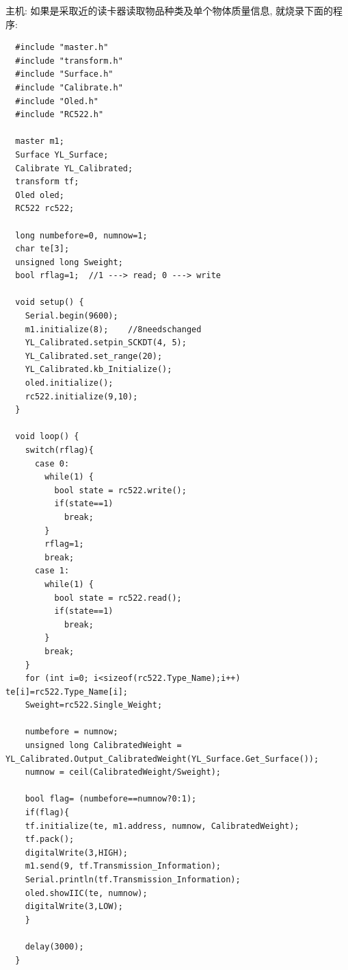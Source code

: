 \documentclass{article}
\begin{document}
\noindent 主机:
如果是采取近的读卡器读取物品种类及单个物体质量信息, 就烧录下面的程序:
\begin{lstlisting}
  #include "master.h"
  #include "transform.h"
  #include "Surface.h"
  #include "Calibrate.h"
  #include "Oled.h"
  #include "RC522.h"
  
  master m1;
  Surface YL_Surface;
  Calibrate YL_Calibrated;
  transform tf;
  Oled oled;
  RC522 rc522;
  
  long numbefore=0, numnow=1;
  char te[3];
  unsigned long Sweight;
  bool rflag=1;  //1 ---> read; 0 ---> write
  
  void setup() {
    Serial.begin(9600);
    m1.initialize(8);    //8needschanged
    YL_Calibrated.setpin_SCKDT(4, 5);
    YL_Calibrated.set_range(20);
    YL_Calibrated.kb_Initialize();
    oled.initialize();  
    rc522.initialize(9,10);
  }
  
  void loop() {
    switch(rflag){
      case 0: 
        while(1) {
          bool state = rc522.write();
          if(state==1)
            break;
        }   
        rflag=1;
        break;
      case 1:
        while(1) {
          bool state = rc522.read();
          if(state==1)
            break;
        }
        break;
    }
    for (int i=0; i<sizeof(rc522.Type_Name);i++) te[i]=rc522.Type_Name[i];
    Sweight=rc522.Single_Weight;
  
    numbefore = numnow;
    unsigned long CalibratedWeight = YL_Calibrated.Output_CalibratedWeight(YL_Surface.Get_Surface());
    numnow = ceil(CalibratedWeight/Sweight);
  
    bool flag= (numbefore==numnow?0:1);
    if(flag){
    tf.initialize(te, m1.address, numnow, CalibratedWeight);
    tf.pack();
    digitalWrite(3,HIGH);
    m1.send(9, tf.Transmission_Information);
    Serial.println(tf.Transmission_Information);
    oled.showIIC(te, numnow);
    digitalWrite(3,LOW);
    }
  
    delay(3000);
  }  
\end{lstlisting}
\end{document}
